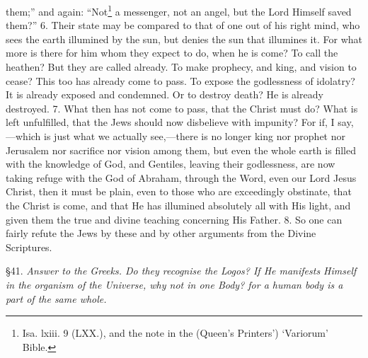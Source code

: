 them;” and again: “Not\footnote{Isa. lxiii. 9 (LXX.), and the note in the (Queen’s Printers’) ‘Variorum’ Bible.} a messenger, not an angel, but the Lord Himself saved them?” 6. Their state may be compared to that of one out of his right mind, who sees the earth illumined by the sun, but denies the sun that illumines it. For what more is there for him whom they expect to do, when he is come? To call the heathen? But they are called already. To make prophecy, and king, and vision to cease? This too has already come to pass. To expose the godlessness of idolatry? It is already exposed and condemned. Or to destroy death? He is already destroyed. 7. What then has not come to pass, that the Christ must do? What is left unfulfilled, that the Jews should now disbelieve with impunity? For if, I say,—which is just what we actually see,—there is no longer king nor prophet nor Jerusalem nor sacrifice nor vision among them, but even the whole earth is filled with the knowledge of God, and Gentiles, leaving their godlessness, are now taking refuge with the God of Abraham, through the Word, even our Lord Jesus Christ, then it must be plain, even to those who are exceedingly obstinate, that the Christ is come, and that He has illumined absolutely all with His light, and given them the true and divine teaching concerning His Father. 8. So one can fairly refute the Jews by these and by other arguments from the Divine Scriptures.


§41. \emph{Answer to the Greeks. Do they recognise the Logos? If He manifests Himself in the organism of the Universe, why not in one Body? for a human body is a part of the same whole.}

